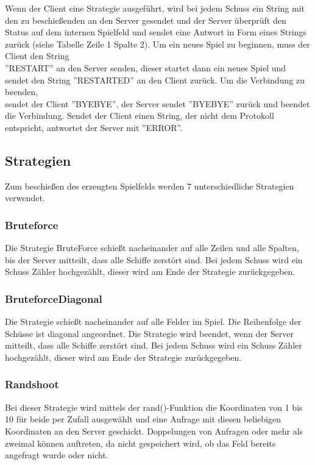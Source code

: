 Wenn der Client eine Strategie ausgeführt, wird bei jedem Schuss ein String mit den zu beschießenden an den Server gesendet und der Server überprüft den Status auf dem internen Spielfeld und sendet eine Antwort in Form eines Strings zurück (siehe Tabelle Zeile 1 Spalte 2).
Um ein neues Spiel zu beginnen, muss der Client den String \\''RESTART'' an den Server senden, dieser startet dann ein neues Spiel und sendet den String ''RESTARTED'' an den Client zurück. Um die Verbindung zu beenden, \\sendet der Client ''BYEBYE'', der Server sendet ''BYEBYE'' zurück und beendet die Verbindung.
Sendet der Client einen String, der nicht dem Protokoll entspricht, antwortet der Server mit ''ERROR''. 

\subsection{Strategien}
Zum beschießen des erzeugten Spielfelds werden 7 unterschiedliche Strategien verwendet.

\subsubsection{Bruteforce}

Die Strategie BruteForce schießt nacheinander auf alle Zeilen und alle Spalten, bis der Server mitteilt, dass alle Schiffe zerstört sind. Bei jedem Schuss wird ein Schuss Zähler hochgezählt, dieser wird am Ende der Strategie zurückgegeben.

\subsubsection{BruteforceDiagonal}

Die Strategie schießt nacheinander auf alle Felder im Spiel. Die Reihenfolge der Schüsse ist diagonal angeordnet. Die Strategie wird beendet, wenn der Server mitteilt, dass alle Schiffe zerstört sind. Bei jedem Schuss wird ein Schuss Zähler hochgezählt, dieser wird am Ende der Strategie zurückgegeben.

\subsubsection{Randshoot}

Bei dieser Strategie wird mittels der rand()-Funktion die Koordinaten von 1 bis 10 für
beide per Zufall ausgewählt und eine Anfrage mit diesen beliebigen Koordinaten an den
Server geschickt. Doppelungen von Anfragen oder mehr als zweimal können auftreten,
da nicht gespeichert wird, ob das Feld bereits angefragt wurde oder nicht.

